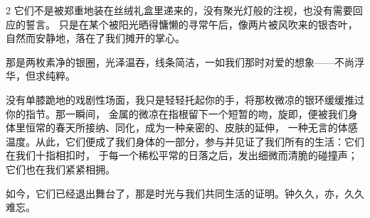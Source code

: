 

\subtitle{钟久久——亦久久难忘}

\large
\begin{spacing}{2}
    它们不是被郑重地装在丝绒礼盒里递来的，没有聚光灯般的注视，也没有需要回应的誓言。
    只是在某个被阳光晒得慵懒的寻常午后，像两片被风吹来的银杏叶，自然而安静地，落在了我们摊开的掌心。

    那是两枚素净的银圈，光泽温吞，线条简洁，一如我们那时对爱的想象——不尚浮华，但求纯粹。

    没有单膝跪地的戏剧性场面，我只是轻轻托起你的手，将那枚微凉的银环缓缓推过你的指节。那一瞬间，
    金属的微凉在指根留下一个短暂的吻，旋即，便被我们身体里恒常的春天所接纳、同化，成为一种亲密的、皮肤的延伸，
    一种无言的体感温度。从此，它们便成了我们身体的一部分，参与并见证了我们所有的生活：它们在我们十指相扣时，
    于每一个稀松平常的日落之后，发出细微而清脆的碰撞声；它们也在我们紧紧相拥。

    如今，它们已经退出舞台了，那是时光与我们共同生活的证明。钟久久，亦，久久难忘。

\end{spacing}



\subtitle{津湾广场——津门灯火记事}

